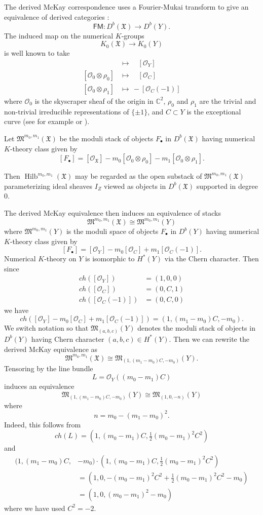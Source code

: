 \documentclass{amsart}
\theoremstyle{definition}
\newcommand{\CC} {{\mathbb C}}          %
\newcommand{\X}{\mathfrak{X}}
\newcommand{\M}{\mathfrak{M}}
\newcommand{\FM}{\mathsf{FM}}
\renewcommand{\O}{\mathcal{O}}
\newcommand{\Hilb}{\operatorname{Hilb}}
\begin{document}
The derived McKay correspondence uses a Fourier-Mukai transform to
give an equivalence of derived categories \cite{BKR, Kapranov-Vasserot}:
\[
\FM :D^{b}(\X )\to D^{b}(Y).
\]
The induced map on the numerical $K$-groups
\[
K_{0}(\X ) \to K_{0}(Y)
\]
is well known to take
\begin{align*}
[\O_{\X}]& \longmapsto \quad [\O_{Y}] \\
[\O_{0}\otimes \rho_{0}] &\longmapsto  \quad [\O_{C}]\\
[\O_{0}\otimes \rho_{1}] &\longmapsto \, -[\O_{C}(-1)]
\end{align*}
where $\O_{0}$ is the skyscraper sheaf of the origin in $\CC^{2}$,
$\rho_{0}$ and $\rho_{1}$ are the trivial and non-trivial irreducible
representations of $\{\pm 1 \}$, and $C\subset Y$ is the exceptional
curve (see for example \cite{Gonzalez-Sprinberg-Verdier} or \cite{Kapranov-Vasserot}).

Let $\M^{m_{0},m_{1}}(\X )$ be the moduli stack of objects $F_{\bullet }$ in
$D^{b}(\X )$ having numerical $K$-theory class given by
\[
[F_{\bullet}] = [\O_{\X}] - m_{0}[\O_{0}\otimes \rho_{0}]  - m_{1}[\O_{0}\otimes \rho_{1}] .
\]

Then $\Hilb^{m_{0},m_{1}}(\X )$ may be regarded as the  open substack
of $\M^{m_{0},m_{1}}(\X )$ parameterizing ideal sheaves $I_{Z}$ viewed
as objects in $D^{b}(\X )$ supported in degree 0.

The derived McKay equivalence then induces an equivalence of stacks
\[
\M^{m_{0},m_{1}}(\X ) \cong  \M^{m_{0},m_{1}}(Y)
\]
where $ \M^{m_{0},m_{1}}(Y)$ is the moduli space of objects
$F_{\bullet}$ in $D^{b}(Y)$ having numerical $K$-theory class given by
\[
[F_{\bullet}] = [\O_{Y}] - m_{0} [\O_{C}]+ m_{1} [\O_{C}(-1)]. 
\]
Numerical $K$-theory on $Y$ is isomorphic to $H^{*}(Y)$ via the Chern
character. Then since
\begin{align*}
ch([\O_{Y}]) &= (1,0,0)\\
ch([\O_{C}]) &= (0,C,1)\\
ch([\O_{C}(-1)]) &= (0,C,0)
\end{align*}
we have
\[
ch( [\O_{Y}] - m_{0} [\O_{C}]+ m_{1} [\O_{C}(-1)]) = (1,(m_{1}-m_{0})C,-m_{0}).
\]
We switch notation so that $\M_{(a,b,c)}(Y)$ denotes the moduli stack
of objects in $D^{b}(Y)$ having Chern character $(a,b,c)\in
H^{*}(Y)$. Then we can rewrite the derived McKay equivalence as
\[
\M^{m_{0},m_{1}}(\X ) \cong \M_{(1,(m_{1}-m_{0})C,-m_{0})}(Y). 
\]
Tensoring by the line bundle
\[
L = \O_{Y}((m_{0}-m_{1})C)
\]
induces an equivalence
\[
\M_{(1,(m_{1}-m_{0})C,-m_{0})}(Y) \cong \M_{(1,0,-n)}(Y)
\]
where
\[
n=m_{0} -(m_{1}-m_{0})^{2}. 
\]
Indeed, this follows from
\[
ch(L) = \left(1,(m_{0}-m_{1})C,\tfrac{1}{2} (m_{0}-m_{1})^{2}C^{2} \right)
\]
and 
\begin{align*}
(1,(m_{1}-m_{0})C,&-m_{0}) \cdot  (1,(m_{0}-m_{1})C,\tfrac{1}{2}
(m_{0}-m_{1})^{2}C^{2})\\
 &= (1,0, - (m_{0}-m_{1})^{2}C^{2} +\tfrac{1}{2}
(m_{0}-m_{1})^{2}C^{2} -m_{0})\\
&= (1,0,(m_{0}-m_{1})^{2}-m_{0})
\end{align*}
where we have used $C^{2}=-2$.
\end{document}
